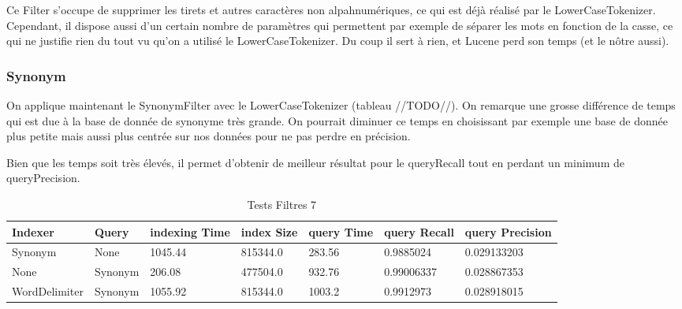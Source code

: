 Ce Filter s’occupe de supprimer les tirets et autres caractères non alpahnumériques, ce qui est déjà réalisé par le LowerCaseTokenizer. Cependant, il dispose aussi d’un certain nombre de paramètres qui permettent par exemple de séparer les mots en fonction de la casse, ce qui ne justifie rien du tout vu qu’on a utilisé le LowerCaseTokenizer. Du coup il sert à rien, et Lucene perd son temps (et le nôtre aussi).

\subsubsection{Synonym}

On applique maintenant le SynonymFilter avec le LowerCaseTokenizer (tableau //TODO//). On remarque une grosse différence de temps qui est due à la base de donnée de synonyme très grande. On pourrait diminuer ce temps en choisissant par exemple une base de donnée plus petite mais aussi plus centrée sur nos données pour ne pas perdre en précision.

Bien que les temps soit très élevés, il permet d’obtenir de meilleur résultat pour le queryRecall tout en perdant un minimum de queryPrecision.

\begin{table}[H]
                \centering
                \begin{tabular}{|p{2cm}|p{2cm}|p{2cm}|p{2cm}|p{2cm}|p{2cm}|p{2cm}|}
                    \hline
                    \textbf{Indexer} & \textbf{Query} & \textbf{indexing Time} & \textbf{index Size} & \textbf{query Time} & \textbf{query Recall} & \textbf{query Precision}\\
                    \hline
Synonym & None & 1045.44 & 815344.0 & 283.56 & 0.9885024 & 0.029133203\\
		\hline
None & Synonym & 206.08 & 477504.0 & 932.76 & 0.99006337 & 0.028867353\\
		\hline
WordDelimiter & Synonym & 1055.92 & 815344.0 & 1003.2 & 0.9912973 & 0.028918015\\
                    \hline
                \end{tabular}
                \caption{Tests Filtres 7}
                \label{tab:tests_filtres_7}
            \end{table}
